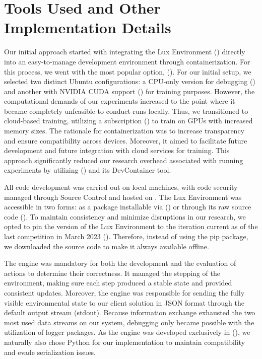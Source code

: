 \chapter{Tools Used and Other Implementation Details}
\label{appx:impl_details}

\noindent Our initial approach started with integrating the Lux Environment (\textcolor{deepblue}{\cite{lux-ai-season-2}}) directly into an easy-to-manage development environment through containerization. For this process, we went with the most popular option,  (\textcolor{deepblue}{\cite{merkel2014docker}}). For our initial setup, we selected two distinct Ubuntu configurations: a CPU-only version for debugging () and another with NVIDIA CUDA support () for training purposes. However, the computational demands of our experiments increased to the point where it became completely unfeasible to conduct runs locally. Thus, we transitioned to cloud-based training, utilizing a  subscription (\textcolor{deepblue}{\cite{Bisong2019}}) to train on GPUs with increased memory sizes. The rationale for containerization was to increase transparency and ensure compatibility across devices. Moreover, it aimed to facilitate future development and future integration with cloud services for training. This approach significantly reduced our research overhead associated with running experiments by utilizing  (\textcolor{deepblue}{\cite{VSCode}}) and its DevContainer tool.

\bigskip

\noindent All code development was carried out on local machines, with code security managed through  Source Control and hosted on . The Lux Environment was accessible in two forms: as a package installable via  (\textcolor{deepblue}{\cite{luxai_s2-pip}}) or through its raw source code (\textcolor{deepblue}{\cite{luxai_s2-source}}). To maintain consistency and minimize disruptions in our research, we opted to pin the version of the Lux Environment to the iteration current as of the last competition in March 2023 (\textcolor{deepblue}{\cite{lux-ai-season-2}}). Therefore, instead of using the pip package, we downloaded the source code to make it always available offline.

\bigskip

\noindent The engine was mandatory for both the development and the evaluation of actions to determine their correctness. It managed the stepping of the environment, making sure each step produced a stable state and provided consistent updates. Moreover, the engine was responsible for sending the fully visible environmental state to our client solution in JSON format through the default output stream (stdout). Because information exchange exhausted the two most used data streams on our system, debugging only became possible with the utilization of logger packages. As the engine was developed exclusively in  (\textcolor{deepblue}{\cite{Python380}}), we naturally also chose Python for our implementation to maintain compatibility and evade serialization issues.

